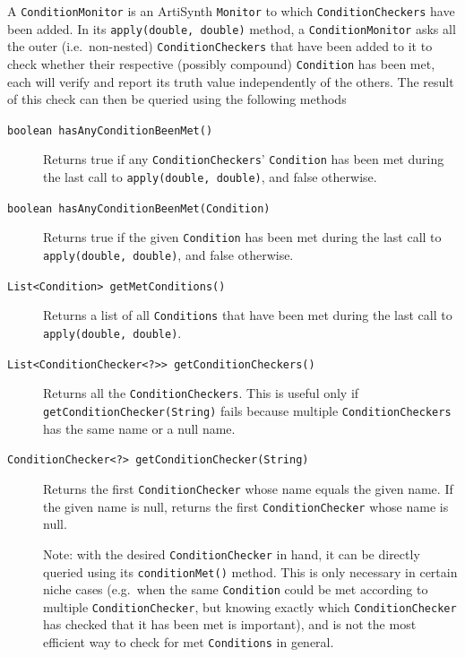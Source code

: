 \documentclass{article}
\begin{document}
A {\tt ConditionMonitor} is an ArtiSynth {\tt Monitor} to which {\tt ConditionCheckers} have been added. In its {\tt apply(double, double)} method, a {\tt ConditionMonitor} asks all the outer (i.e.\ non-nested) {\tt ConditionCheckers} that have been added to it to check whether their respective (possibly compound) {\tt Condition} has been met, each will verify and report its truth value independently of the others. The result of this check can then be queried using the following methods

\begin{description}

\item[{\tt boolean hasAnyConditionBeenMet()} ] \mbox{}

Returns true if any {\tt ConditionCheckers}' {\tt Condition} has been met during the last call to {\tt apply(double, double)}, and false otherwise.

\item[{\tt boolean hasAnyConditionBeenMet(Condition)} ] \mbox{}

Returns true if the given {\tt Condition} has been met during the last call to {\tt apply(double, double)}, and false otherwise.

\item[{\tt List<Condition> getMetConditions()} ] \mbox{}

Returns a list of all {\tt Conditions} that have been met during the last call to {\tt apply(double, double)}.

\item[{\tt List<ConditionChecker<?>{}> getConditionCheckers()} ] \mbox{}

Returns all the {\tt ConditionCheckers}. This is useful only if {\tt getConditionChecker(String)} fails because multiple {\tt ConditionCheckers} has the same name or a null name.

\item[{\tt ConditionChecker<?> getConditionChecker(String)} ] \mbox{}

Returns the first {\tt ConditionChecker} whose name equals the given name. If the given name is null, returns the first {\tt ConditionChecker} whose name is null.

\begin{sideblock}
Note: with the desired {\tt ConditionChecker} in hand, it can be directly queried using its {\tt conditionMet()} method. This is only necessary in certain niche cases (e.g.\ when the same {\tt Condition} could be met according to multiple {\tt ConditionChecker}, but knowing exactly which {\tt ConditionChecker} has checked that it has been met is important), and is not the most efficient way to check for met {\tt Conditions} in general.
\end{sideblock}

\end{description}
\end{document}
